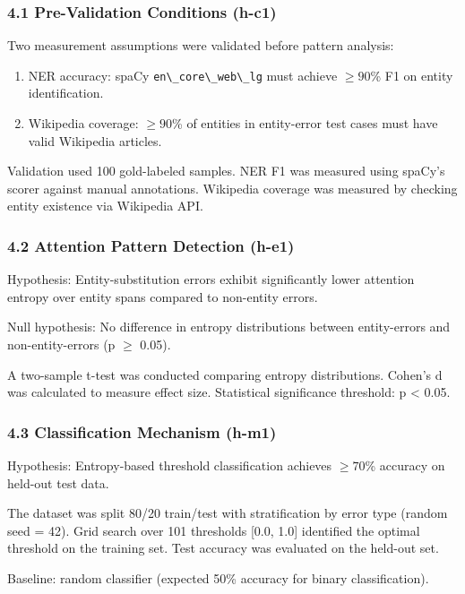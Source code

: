 
\subsubsection{4.1 Pre-Validation Conditions (h-c1)}

Two measurement assumptions were validated before pattern analysis:

\begin{enumerate}
\item NER accuracy: spaCy \texttt{en\textbackslash \_core\textbackslash \_web\textbackslash \_lg} must achieve $\geq 90$\% F1 on entity identification.
\item Wikipedia coverage: $\geq 90$\% of entities in entity-error test cases must have valid Wikipedia articles.
\end{enumerate}

Validation used 100 gold-labeled samples. NER F1 was measured using spaCy's scorer against manual annotations. Wikipedia coverage was measured by checking entity existence via Wikipedia API.

\subsubsection{4.2 Attention Pattern Detection (h-e1)}

Hypothesis: Entity-substitution errors exhibit significantly lower attention entropy over entity spans compared to non-entity errors.

Null hypothesis: No difference in entropy distributions between entity-errors and non-entity-errors (p $\geq$ 0.05).

A two-sample t-test was conducted comparing entropy distributions. Cohen's d was calculated to measure effect size. Statistical significance threshold: p < 0.05.

\subsubsection{4.3 Classification Mechanism (h-m1)}

Hypothesis: Entropy-based threshold classification achieves $\geq 70$\% accuracy on held-out test data.

The dataset was split 80/20 train/test with stratification by error type (random seed = 42). Grid search over 101 thresholds [0.0, 1.0] identified the optimal threshold on the training set. Test accuracy was evaluated on the held-out set.

Baseline: random classifier (expected 50\% accuracy for binary classification).

